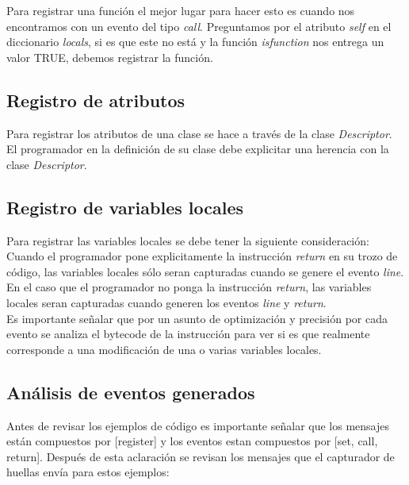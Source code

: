 \documentclass[10pt,a4paper]{article}
\begin{document}
Para registrar una función el mejor lugar para hacer esto es cuando nos encontramos con un evento del tipo \textit{call}.  Preguntamos por el atributo \textit{self} en el diccionario \textit{locals}, si es que este no está y la función \textit{isfunction} nos entrega un valor TRUE, debemos registrar la función.\\

\subsection{Registro de atributos}

Para registrar los atributos de una clase se hace a través de la clase \textit{Descriptor}.  El programador en la definición de su clase debe explicitar una herencia con la clase \textit{Descriptor}.

\subsection{Registro de variables locales}

Para registrar las variables locales se debe tener la siguiente consideración:\\

Cuando el programador pone explicitamente la instrucción \textit{return} en su trozo de código, las variables locales sólo seran capturadas cuando se genere el evento \textit{line}.  En el caso que el programador no ponga la instrucción \textit{return}, las variables locales seran capturadas cuando generen los eventos \textit{line} y \textit{return}.\\

Es importante señalar que por un asunto de optimización y precisión por cada evento se analiza el bytecode de la instrucción para ver si es que realmente corresponde a una modificación de una o varias variables locales.\\

\subsection{Análisis de eventos generados}
Antes de revisar los ejemplos de código es importante señalar que los mensajes están compuestos por [register] y los eventos estan compuestos por [set, call, return].  Después de esta aclaración se revisan los mensajes que el capturador de huellas envía para estos ejemplos:
\\
\end{document}
